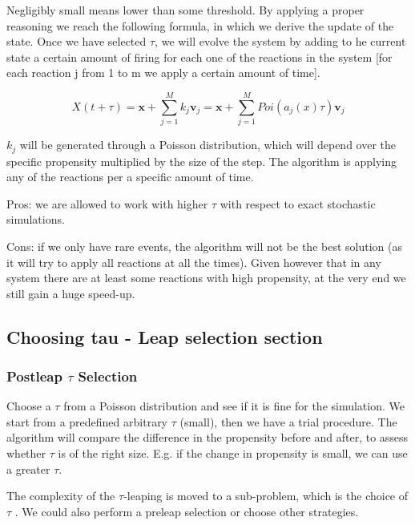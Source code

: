 Negligibly small means lower than some threshold. By applying a proper
reasoning we reach the following formula, in which we derive the update
of the state. Once we have selected $\tau$, we will evolve the system by
adding to he current state a certain amount of firing for each one of
the reactions in the system {[}for each reaction j from 1 to m we apply
a certain amount of time{]}.

$$
                X(t+\tau)=\mathbf{x}+\sum_{j=1}^{M}k_j\mathbf{v}_j =\mathbf{x}+\sum_{j=1}^{M}Poi(a_j(x)\tau)\mathbf{v}_j         
$$

$k_j$ will be generated through a Poisson distribution, which will
depend over the specific propensity multiplied by the size of the step.
The algorithm is applying any of the reactions per a specific amount of
time.

Pros: we are allowed to work with higher $\tau$ with respect to exact
stochastic simulations.

Cons: if we only have rare events, the algorithm will not be the best
solution (as it will try to apply all reactions at all the times). Given
however that in any system there are at least some reactions with high
propensity, at the very end we still gain a huge speed-up.

\hypertarget{choosing-tau---leap-selection-section}{%
\subsection{Choosing tau - Leap selection
section}\label{choosing-tau---leap-selection-section}}

\hypertarget{postleap-tau-selection}{%
\subsubsection{\texorpdfstring{\textbf{Postleap $\tau$
Selection}}{Postleap  Selection}}\label{postleap-tau-selection}}

Choose a $\tau$ from a Poisson distribution and see if it is fine for
the simulation. We start from a predefined arbitrary $\tau$ (small),
then we have a trial procedure. The algorithm will compare the
difference in the propensity before and after, to assess whether $\tau$
is of the right size. E.g. if the change in propensity is small, we can
use a greater $\tau$.

The complexity of the $\tau$-leaping is moved to a sub-problem, which is
the choice of $\tau$ . We could also perform a preleap selection or
choose other strategies.

